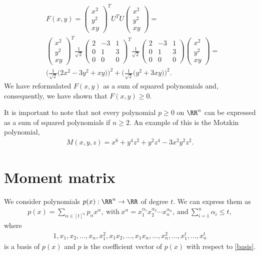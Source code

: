 \documentclass[a4paper,twoside,justified]{tufte-handout}
\begin{document}
\begin{align*}
&F(x,y)=\begin{pmatrix}
x^2\\
y^2\\
xy
\end{pmatrix}^T
U^TU
\begin{pmatrix}
x^2\\
y^2\\
xy
\end{pmatrix}
=\\
&\begin{pmatrix}
x^2\\
y^2\\
xy
\end{pmatrix}^T
\frac{1}{\sqrt{2}}
\begin{pmatrix}
2 & -3 & 1\\
0 & 1 & 3\\
0 & 0 & 0
\end{pmatrix}^T
\frac{1}{\sqrt{2}}
\begin{pmatrix}
2 & -3 & 1\\
0 & 1 & 3\\
0 & 0 & 0
\end{pmatrix}
\begin{pmatrix}
x^2\\
y^2\\
xy
\end{pmatrix}=\\
&\bigg(\frac{1}{\sqrt{2}}\big(2x^2-3y^2+xy\big)\bigg)^2+\bigg(\frac{1}{\sqrt{2}}\big(y^2+3xy\big)\bigg)^2.
\end{align*}
We have reformulated $F(x,y)$ as a sum of squared polynomials and, consequently, we have shown that $F(x,y)\geq0$.

It is important to note that not every polynomial $p\geq 0$ on $\RR^n$ can be expressed as a sum of squared polynomials if $n\geq2$. An example of this is the Motzkin polynomial\cite{motzkin1967sos},
\begin{align*}
M(x,y,z)=x^6+y^4z^2+y^2z^4-3x^2y^2z^2.
\end{align*}

\section{Moment matrix\cite{lasserre2001globalOpt}}
We consider polynomials $p(x):\RR^n\rightarrow\RR$ of degree $t$. We can express them as
\begin{eqnarray*}
p(x)=\sum_{\alpha \in [t]^n}p_{\alpha}x^{\alpha},\ \text{with}\   x^{\alpha}=x_1^{\alpha_1}x_2^{\alpha_2}\cdots x_n^{\alpha_n},\ \text{and}\  \sum_{i=1}^n\alpha_i\leq t,
\end{eqnarray*}
where 
\begin{align}
\label{basis}
1,x_1,x_2,\ldots,x_n,x_1^2,x_1x_2,\ldots,x_1x_n,\ldots,x_n^2,\dots,x_1^t,\ldots,x_n^t
\end{align}
is a basis of $p(x)$ and $p$ is the coefficient vector of $p(x)$ with respect to \eqref{basis}. 
\end{document}
